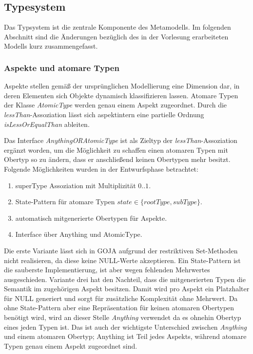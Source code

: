 \subsection{Typesystem}
Das Typsystem ist die zentrale Komponente des Metamodells. Im folgenden Abschnitt sind die 
Änderungen bezüglich des in der Vorlesung erarbeiteten Modells kurz zusammengefasst.

\subsubsection{Aspekte und atomare Typen}

Aspekte stellen gemäß der ursprünglichen Modellierung eine Dimension dar, in deren Elementen sich Objekte dynamisch klassifizieren lassen. 
Atomare Typen der Klasse \emph{AtomicType} werden genau einem Aspekt zugeordnet. Durch die \emph{lessThan}-Assoziation lässt sich aspektintern eine 
partielle Ordnung \emph{isLessOrEqualThan} ableiten.  


Das Interface \emph{AnythingORAtomicType} ist als Zieltyp der \emph{lessThan}-Assoziation ergänzt worden, 
um die Möglichkeit zu schaffen einen atomaren Typen mit Obertyp so zu ändern, dass er anschließend keinen 
Obertypen mehr besitzt. Folgende Möglichkeiten wurden in der Entwurfsphase betrachtet: 
\begin{enumerate}
  		\item superType Assoziation mit Multiplizität $0..1$.
		\item State-Pattern für atomare Typen \(state \in \{rootType, subType\}\).
        \item automatisch mitgenerierte Obertypen für Aspekte.
        \item Interface über Anything und AtomicType.
\end{enumerate}

Die erste Variante lässt sich in GOJA aufgrund der restriktiven Set-Methoden nicht realisieren, da diese keine NULL-Werte akzeptieren.
Ein State-Pattern ist die sauberste Implementierung, ist aber wegen fehlenden Mehrwertes ausgeschieden. 
Variante drei hat den Nachteil, dass die mitgenerierten Typen die Semantik  im zugehörigen Aspekt besitzen.
Damit wird pro Aspekt ein Platzhalter für NULL generiert und sorgt für zusätzliche Komplexität ohne Mehrwert. 
Da ohne State-Pattern aber eine Repräsentation für keinen atomaren Obertypen benötigt wird, wird an dieser Stelle \emph{Anything} verwendet 
da es ohnehin Obertyp eines jeden Typen ist. Das ist auch der wichtigste Unterschied zwischen \emph{Anything} und einem atomaren Obertyp; Anything ist Teil jedes Aspekts, 
während atomare Typen genau einem Aspekt zugeordnet sind. 


